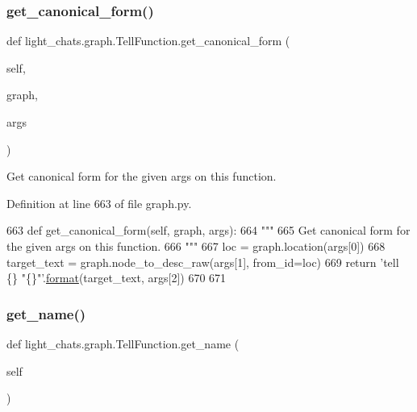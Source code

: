 \subsubsection{\texorpdfstring{get\+\_\+canonical\+\_\+form()}{get\_canonical\_form()}}
{\footnotesize\ttfamily def light\+\_\+chats.\+graph.\+Tell\+Function.\+get\+\_\+canonical\+\_\+form (\begin{DoxyParamCaption}\item[{}]{self,  }\item[{}]{graph,  }\item[{}]{args }\end{DoxyParamCaption})}

\begin{DoxyVerb}Get canonical form for the given args on this function.
\end{DoxyVerb}
 

Definition at line 663 of file graph.\+py.


\begin{DoxyCode}
663     \textcolor{keyword}{def }get\_canonical\_form(self, graph, args):
664         \textcolor{stringliteral}{"""}
665 \textcolor{stringliteral}{        Get canonical form for the given args on this function.}
666 \textcolor{stringliteral}{        """}
667         loc = graph.location(args[0])
668         target\_text = graph.node\_to\_desc\_raw(args[1], from\_id=loc)
669         \textcolor{keywordflow}{return} \textcolor{stringliteral}{'tell \{\} "\{\}"'}.\hyperlink{namespaceparlai_1_1chat__service_1_1services_1_1messenger_1_1shared__utils_a32e2e2022b824fbaf80c747160b52a76}{format}(target\_text, args[2])
670 
671 
\end{DoxyCode}
\mbox{\label{classlight__chats_1_1graph_1_1TellFunction_a39a099e864d0d20f997c03d96d7e1df8}} 
\subsubsection{\texorpdfstring{get\+\_\+name()}{get\_name()}}
{\footnotesize\ttfamily def light\+\_\+chats.\+graph.\+Tell\+Function.\+get\+\_\+name (\begin{DoxyParamCaption}\item[{}]{self }\end{DoxyParamCaption})}


